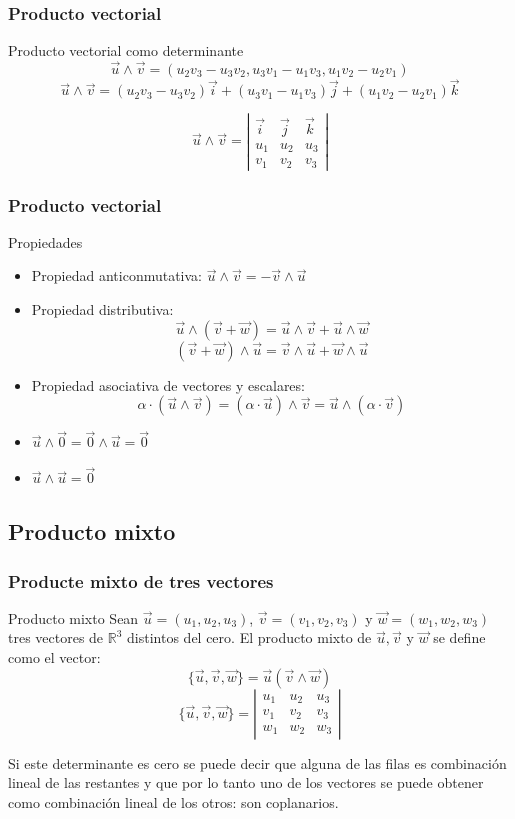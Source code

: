 \documentclass{beamer}
\begin{document}
\begin{frame}
  \frametitle{Producto vectorial}
    \begin{block}{Producto vectorial como determinante}
\[\vec u \wedge \vec v = (u_2v_3-u_3v_2,u_3v_1-u_1v_3,u_1v_2-u_2v_1)\]
\[\vec u \wedge \vec v = (u_2v_3-u_3v_2)\vec i + (u_3v_1-u_1v_3)\vec j+(u_1v_2-u_2v_1)\vec k\]

\[\vec u \wedge \vec v  =
\left|\begin{array}{ccc}\vec i & \vec j & \vec k \\u_1 & u_2 & u_3 \\v_1 & v_2 & v_3\end{array}\right|
\]

\end{block}
\end{frame}


\begin{frame}
  \frametitle{Producto vectorial}
    \begin{block}{Propiedades}
\begin{itemize}
\item Propiedad anticonmutativa: $\vec u \wedge \vec v = -\vec v \wedge \vec u$
\item Propiedad distributiva:
 \[\vec u \wedge( \vec v+\vec w) = \vec u\wedge \vec v + \vec u \wedge \vec w\]
 \[ ( \vec v+\vec w) \wedge \vec u = \vec v\wedge \vec u + \vec w \wedge \vec u\]
 \item Propiedad asociativa de vectores y escalares:
 \[\alpha\cdot ( \vec u\wedge\vec v) =(\alpha\cdot  \vec u)\wedge\vec v =   \vec u\wedge(\alpha\cdot\vec v) \]
 \item $\vec u \wedge \vec 0 = \vec 0 \wedge \vec u = \vec 0$
 \item $\vec u \wedge \vec u = \vec 0$
\end{itemize}
\end{block}
\end{frame}

\subsection{Producto mixto}

\begin{frame}
  \frametitle{Producte mixto de tres vectores}
    \begin{block}{Producto mixto}
Sean $\vec u = (u_1,u_2,u_3)$, $\vec v = (v_1,v_2,v_3)$ y $\vec w = (w_1,w_2,w_3)$ tres vectores de $\mathbb R^3$ distintos del cero. El producto mixto de $\vec u, \vec v$ y $\vec w$ se define como el vector:
\[\{\vec u, \vec v,\vec w\} = \vec u (\vec v \wedge \vec w)\]
\[\{\vec u, \vec v,\vec w\} = \left|\begin{array}{ccc}u_1 & u_2 & u_3 \\v_1 & v_2 & v_3\\w_1 & w_2 & w_3\end{array}\right|
 \]
  \end{block}
  Si este determinante es cero se puede decir que alguna de las filas es combinaci\'on lineal de las restantes y que por lo tanto uno de los vectores se puede obtener como combinaci\'on lineal de los otros: son coplanarios.
\end{frame}
\end{document}
